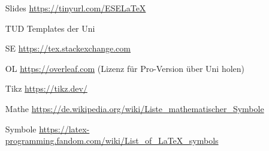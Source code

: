 \begin{frame}
\hspace{2em}
\begin{minipage}{.9\textwidth}
\begin{itemize}[<+->]
	\item[Slides] \url{https://tinyurl.com/ESELaTeX}
	\item[TUD] Templates der Uni
	\item[SE] \url{https://tex.stackexchange.com}
	\item[OL] \url{https://overleaf.com} (Lizenz für Pro-Version über Uni holen)
	\item[Tikz] \url{https://tikz.dev/}
	\item[Mathe] \url{https://de.wikipedia.org/wiki/Liste_mathematischer_Symbole}
	\item[Symbole] \url{https://latex-programming.fandom.com/wiki/List_of_LaTeX_symbols}
\end{itemize}
\end{minipage}
\end{frame}
